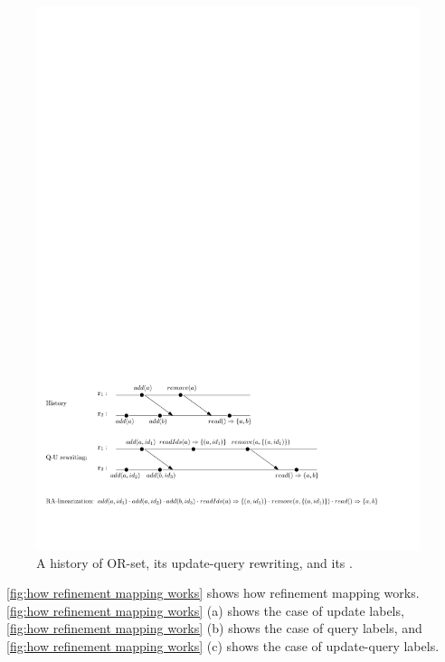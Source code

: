\begin{figure}[t]
  \centering
  \includegraphics[width=0.8 \textwidth]{figures/ORSetHisRewritingandLin.pdf}
\vspace{-10pt}
  \caption{A history of OR-set, its update-query rewriting, and its \crdtlinearization{}.}
  \label{fig:a history of OR-set, its update-query rewriting, and its RA-linearization}
\end{figure}


\figurename~\ref{fig:how refinement mapping works} shows how refinement mapping works. \figurename~\ref{fig:how refinement mapping works} (a) shows the case of update labels, \figurename~\ref{fig:how refinement mapping works} (b) shows the case of query labels, and \figurename~\ref{fig:how refinement mapping works} (c) shows the case of update-query labels.


